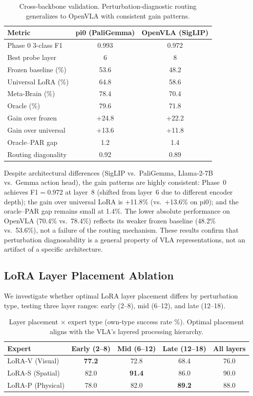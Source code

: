 \documentclass[conference]{article}
\newcommand{\ours}{Meta-Brain}
\begin{document}
\begin{table}[h]
\centering
\caption{Cross-backbone validation. Perturbation-diagnostic routing generalizes to OpenVLA with consistent gain patterns.}
\label{tab:cross_backbone}
\small
\begin{tabular}{lcc}
\toprule
Metric & pi0 (PaliGemma) & OpenVLA (SigLIP) \\
\midrule
Phase 0 3-class F1 & 0.993 & 0.972 \\
Best probe layer & 6 & 8 \\
Frozen baseline (\%) & 53.6 & 48.2 \\
Universal LoRA (\%) & 64.8 & 58.6 \\
\ours{} (\%) & 78.4 & 70.4 \\
Oracle (\%) & 79.6 & 71.8 \\
Gain over frozen & +24.8 & +22.2 \\
Gain over universal & +13.6 & +11.8 \\
Oracle--PAR gap & 1.2 & 1.4 \\
Routing diagonality & 0.92 & 0.89 \\
\bottomrule
\end{tabular}
\end{table}

Despite architectural differences (SigLIP vs.\ PaliGemma, Llama-2-7B vs.\ Gemma action head), the gain patterns are highly consistent:
Phase~0 achieves F1$=$0.972 at layer~8 (shifted from layer~6 due to different encoder depth);
the gain over universal LoRA is +11.8\% (vs.\ +13.6\% on pi0);
and the oracle--PAR gap remains small at 1.4\%.
The lower absolute performance on OpenVLA (70.4\% vs.\ 78.4\%) reflects its weaker frozen baseline (48.2\% vs.\ 53.6\%), not a failure of the routing mechanism.
These results confirm that perturbation diagnosability is a general property of VLA representations, not an artifact of a specific architecture.

\subsection{LoRA Layer Placement Ablation}
\label{sec:layer_placement}

We investigate whether optimal LoRA layer placement differs by perturbation type, testing three layer ranges: early (2--8), mid (6--12), and late (12--18).

\begin{table}[h]
\centering
\caption{Layer placement $\times$ expert type (own-type success rate \%). Optimal placement aligns with the VLA's layered processing hierarchy.}
\label{tab:layer_place}
\small
\begin{tabular}{lcccc}
\toprule
Expert & Early (2--8) & Mid (6--12) & Late (12--18) & All layers \\
\midrule
LoRA-V (Visual) & \textbf{77.2} & 72.8 & 68.4 & 76.0 \\
LoRA-S (Spatial) & 82.0 & \textbf{91.4} & 86.0 & 90.0 \\
LoRA-P (Physical) & 78.0 & 82.0 & \textbf{89.2} & 88.0 \\
\bottomrule
\end{tabular}
\end{table}
\end{document}
